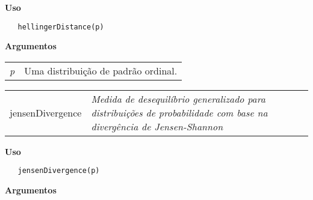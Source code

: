\vspace{-0.5cm}

\hrulefill  

\vspace{0.5cm}

\textbf{Uso}

\begin{lstlisting}
   hellingerDistance(p)
\end{lstlisting}

\vspace{0.5cm}

\textbf{Argumentos}

\begin{table}[!ht]
\begin{center}
\begin{tabularx}{\textwidth}{X X}
\hspace{0.5cm} \textit{p} & Uma distribuição de padrão ordinal.\\
\end{tabularx}
\end{center}
\end{table} 


\hrulefill   

\begin{table}[!ht]
\begin{center}
\begin{tabularx}{\textwidth}{ X X}
\hspace{0.5cm} jensenDivergence & \textit{Medida de desequilíbrio generalizado para distribuições de probabilidade com base na divergência de Jensen-Shannon}\\
\end{tabularx}
\end{center}
\end{table} 

\vspace{-0.5cm}

\hrulefill  

\vspace{0.5cm}

\textbf{Uso}

\begin{lstlisting}
   jensenDivergence(p)
\end{lstlisting}

\vspace{0.5cm}

\textbf{Argumentos}

